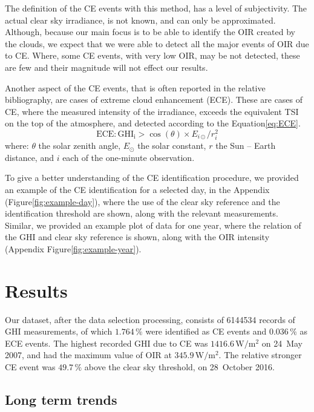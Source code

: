 \documentclass[preprint, 5p,
authoryear]{elsarticle} %
\begin{document}
The definition of the CE events with this method, has a level of
subjectivity. The actual clear sky irradiance, is not known, and can
only be approximated. Although, because our main focus is to be able to
identify the OIR created by the clouds, we expect that we were able to
detect all the major events of OIR due to CE. Where, some CE events,
with very low OIR, may be not detected, these are few and their
magnitude will not effect our results.

Another aspect of the CE events, that is often reported in the relative
bibliography, are cases of extreme cloud enhancement (ECE). These are
cases of CE, where the measured intensity of the irradiance, exceeds the
equivalent TSI on the top of the atmosphere, and detected according to
the Equation\nobreakspace{}\ref{eq:ECE}. \begin{equation}
\text{ECE}: \text{GHI}_\text{i} > \cos(\theta) \times E_{i\odot} / r_{i}^2
\label{eq:ECE}
\end{equation} where: \(\theta\) the solar zenith angle, \(E_{\odot}\)
the solar constant, \(r\) the Sun -- Earth distance, and \(i\) each of
the one-minute observation.

To give a better understanding of the CE identification procedure, we
provided an example of the CE identification for a selected day, in the
Appendix (Figure\nobreakspace{}\ref{fig:example-day}), where the use of
the clear sky reference and the identification threshold are shown,
along with the relevant measurements. Similar, we provided an example
plot of data for one year, where the relation of the GHI and clear sky
reference is shown, along with the OIR intensity (Appendix
Figure\nobreakspace{}\ref{fig:example-year}).

\hypertarget{results}{%
\section{Results}\label{results}}

Our dataset, after the data selection processing, consists of 6144534
records of GHI measurements, of which \(1.764\,\%\) were identified as
CE events and \(0.036\,\%\) as ECE events. The highest recorded GHI due
to CE was \(1416.6\,\text{W}/\text{m}^2\) on 24~May 2007, and had the
maximum value of OIR at \(345.9\,\text{W}/\text{m}^2\). The relative
stronger CE event was \(49.7\,\%\) above the clear sky threshold, on
28~October 2016.

\hypertarget{long-term-trends}{%
\subsection{Long term trends}\label{long-term-trends}}
\end{document}
